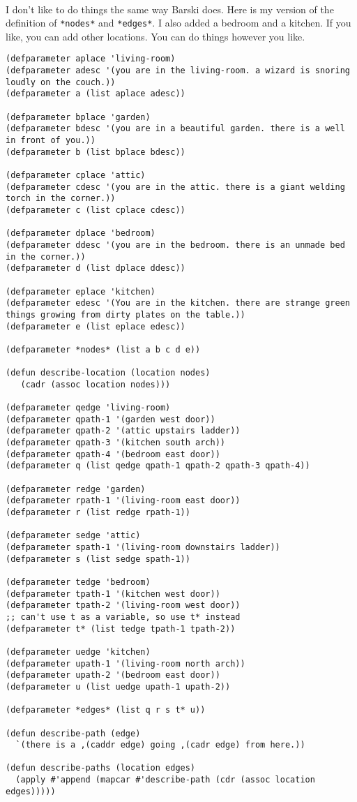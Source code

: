 \documentclass{article}
\begin{document}
\paragraph{}I don't like to do things the same way Barski does. Here is my version of the definition of \texttt{*nodes*} and \texttt{*edges*}. I also added a bedroom and a kitchen. If you like, you can add other locations. You can do things however you like.

\lstset{language=Lisp,numbers=left,keepspaces=false,basicstyle=\small,numberstyle=\tiny,breaklines=true,showstringspaces=false}
\begin{lstlisting}
(defparameter aplace 'living-room)
(defparameter adesc '(you are in the living-room. a wizard is snoring loudly on the couch.))
(defparameter a (list aplace adesc))

(defparameter bplace 'garden)
(defparameter bdesc '(you are in a beautiful garden. there is a well in front of you.))
(defparameter b (list bplace bdesc))

(defparameter cplace 'attic)
(defparameter cdesc '(you are in the attic. there is a giant welding torch in the corner.))
(defparameter c (list cplace cdesc))

(defparameter dplace 'bedroom)
(defparameter ddesc '(you are in the bedroom. there is an unmade bed in the corner.))
(defparameter d (list dplace ddesc))

(defparameter eplace 'kitchen)
(defparameter edesc '(You are in the kitchen. there are strange green things growing from dirty plates on the table.))
(defparameter e (list eplace edesc))

(defparameter *nodes* (list a b c d e))

(defun describe-location (location nodes)
   (cadr (assoc location nodes)))

(defparameter qedge 'living-room)
(defparameter qpath-1 '(garden west door))
(defparameter qpath-2 '(attic upstairs ladder))
(defparameter qpath-3 '(kitchen south arch))
(defparameter qpath-4 '(bedroom east door))
(defparameter q (list qedge qpath-1 qpath-2 qpath-3 qpath-4))

(defparameter redge 'garden)
(defparameter rpath-1 '(living-room east door))
(defparameter r (list redge rpath-1))

(defparameter sedge 'attic)
(defparameter spath-1 '(living-room downstairs ladder))
(defparameter s (list sedge spath-1))

(defparameter tedge 'bedroom)
(defparameter tpath-1 '(kitchen west door))
(defparameter tpath-2 '(living-room west door))
;; can't use t as a variable, so use t* instead
(defparameter t* (list tedge tpath-1 tpath-2))

(defparameter uedge 'kitchen)
(defparameter upath-1 '(living-room north arch))
(defparameter upath-2 '(bedroom east door))
(defparameter u (list uedge upath-1 upath-2))

(defparameter *edges* (list q r s t* u))

(defun describe-path (edge)
  `(there is a ,(caddr edge) going ,(cadr edge) from here.))

(defun describe-paths (location edges)
  (apply #'append (mapcar #'describe-path (cdr (assoc location edges)))))
\end{lstlisting}
\end{document}
